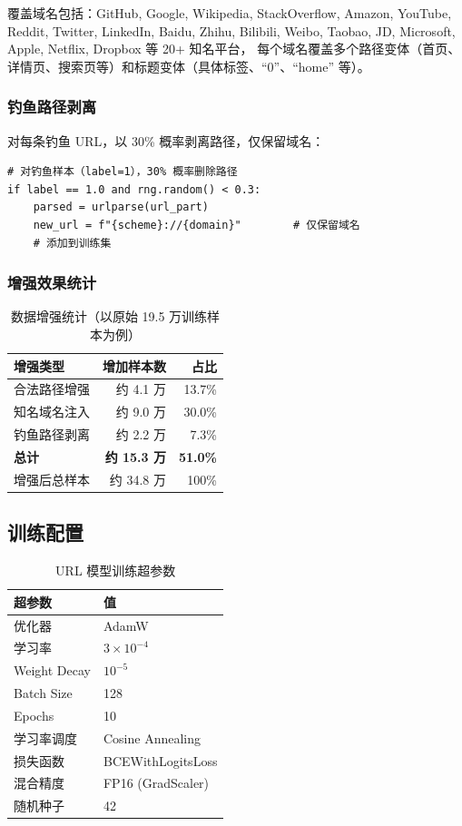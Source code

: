 \documentclass[11pt,a4paper]{article}
\begin{document}
覆盖域名包括：GitHub, Google, Wikipedia, StackOverflow, Amazon, YouTube, Reddit, Twitter, LinkedIn, Baidu, Zhihu, Bilibili, Weibo, Taobao, JD, Microsoft, Apple, Netflix, Dropbox 等 20+ 知名平台，
每个域名覆盖多个路径变体（首页、详情页、搜索页等）和标题变体（具体标签、``0''、``home'' 等）。

\subsubsection{钓鱼路径剥离}

对每条钓鱼 URL，以 30\% 概率剥离路径，仅保留域名：

\begin{Verbatim}[frame=single,fontsize=\small]
# 对钓鱼样本（label=1），30% 概率删除路径
if label == 1.0 and rng.random() < 0.3:
    parsed = urlparse(url_part)
    new_url = f"{scheme}://{domain}"        # 仅保留域名
    # 添加到训练集
\end{Verbatim}

\subsubsection{增强效果统计}

\begin{table}[h]
\centering
\caption{数据增强统计（以原始 19.5 万训练样本为例）}
\begin{tabular}{lrr}
\toprule
增强类型 & 增加样本数 & 占比 \\
\midrule
合法路径增强 & 约 4.1 万 & 13.7\% \\
知名域名注入 & 约 9.0 万 & 30.0\% \\
钓鱼路径剥离 & 约 2.2 万 & 7.3\% \\
\midrule
\textbf{总计} & \textbf{约 15.3 万} & \textbf{51.0\%} \\
增强后总样本 & 约 34.8 万 & 100\% \\
\bottomrule
\end{tabular}
\end{table}

\subsection{训练配置}

\begin{table}[h]
\centering
\caption{URL 模型训练超参数}
\begin{tabular}{ll}
\toprule
超参数 & 值 \\
\midrule
优化器 & AdamW \\
学习率 & $3\times10^{-4}$ \\
Weight Decay & $10^{-5}$ \\
Batch Size & 128 \\
Epochs & 10 \\
学习率调度 & Cosine Annealing \\
损失函数 & BCEWithLogitsLoss \\
混合精度 & FP16 (GradScaler) \\
随机种子 & 42 \\
\bottomrule
\end{tabular}
\end{table}
\end{document}
